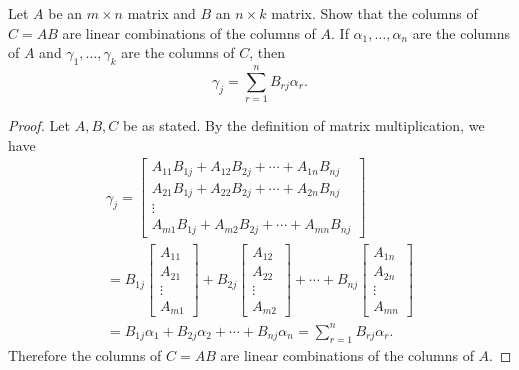  Let $A$ be an $m\times n$ matrix and $B$ an $n\times k$
matrix. Show that the columns of $C = AB$ are linear combinations of
the columns of $A$. If $\alpha_1,\dots,\alpha_n$ are the columns of
$A$ and $\gamma_1,\dots,\gamma_k$ are the columns of $C$, then
\begin{equation*}
  \gamma_j = \sum_{r=1}^nB_{rj}\alpha_r.
\end{equation*}
\begin{proof}
  Let $A,B,C$ be as stated. By the definition of matrix
  multiplication, we have
  \begin{multline*}
    \gamma_j =
    \begin{bmatrix}
      A_{11}B_{1j} + A_{12}B_{2j} + \cdots + A_{1n}B_{nj} \\
      A_{21}B_{1j} + A_{22}B_{2j} + \cdots + A_{2n}B_{nj} \\
      \vdots \\
      A_{m1}B_{1j} + A_{m2}B_{2j} + \cdots + A_{mn}B_{nj}
    \end{bmatrix} \\
    = B_{1j}
    \begin{bmatrix}
      A_{11} \\
      A_{21} \\
      \vdots \\
      A_{m1}
    \end{bmatrix}
    + B_{2j}
    \begin{bmatrix}
      A_{12} \\
      A_{22} \\
      \vdots \\
      A_{m2}
    \end{bmatrix}
    + \cdots + B_{nj}
    \begin{bmatrix}
      A_{1n} \\
      A_{2n} \\
      \vdots \\
      A_{mn}
    \end{bmatrix} \\
    = B_{1j}\alpha_1 + B_{2j}\alpha_2 + \cdots + B_{nj}\alpha_n =
    \sum_{r=1}^nB_{rj}\alpha_r.
  \end{multline*}
  Therefore the columns of $C = AB$ are linear combinations of the
  columns of $A$.
\end{proof}

%
